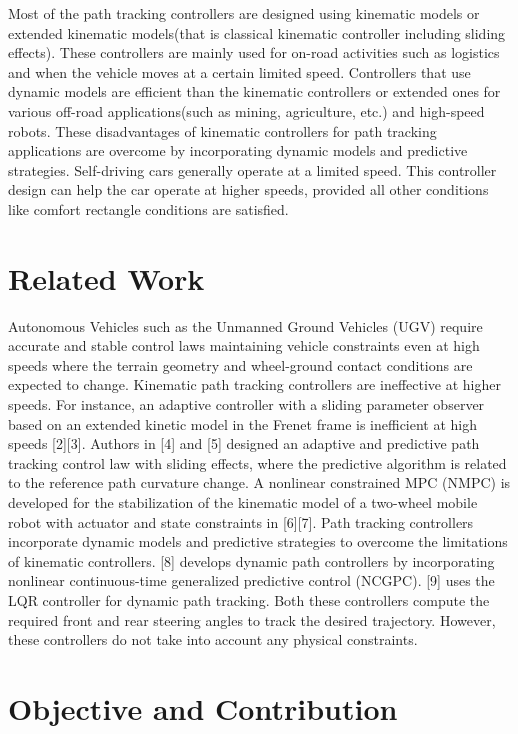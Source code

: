 \documentclass{IEEEtran}
\begin{document}
Most of the path tracking controllers are designed using kinematic models or extended kinematic models(that is classical kinematic controller including sliding effects). These controllers are mainly used for on-road activities such as logistics and when the vehicle moves at a certain limited speed. Controllers that use dynamic models are efficient than the kinematic controllers or extended ones for various off-road applications(such as mining, agriculture, etc.) and high-speed robots. These disadvantages of kinematic controllers for path tracking applications are overcome by incorporating dynamic models and predictive strategies. Self-driving cars generally operate at a limited speed. This controller design can help the car operate at higher speeds, provided all other conditions like comfort rectangle conditions are satisfied. 

\section{Related Work}
Autonomous Vehicles such as the Unmanned Ground Vehicles (UGV) require accurate and stable control laws maintaining vehicle constraints even at high speeds where the terrain geometry and wheel-ground contact conditions are expected to change. Kinematic path tracking controllers are ineffective at higher speeds. For instance, an adaptive controller with a sliding parameter observer based on an extended kinetic model in the Frenet frame is inefficient at high speeds [2][3]. Authors in [4] and [5] designed an adaptive and predictive path tracking control law with sliding effects, where the predictive algorithm is related to the reference path curvature change. A nonlinear constrained MPC (NMPC) is developed for the stabilization of the kinematic model of a two-wheel mobile robot with actuator and state constraints in [6][7]. Path tracking controllers incorporate dynamic models and predictive strategies to overcome the limitations of kinematic controllers. [8] develops dynamic path controllers by incorporating nonlinear continuous-time generalized predictive control (NCGPC). [9] uses the LQR controller for dynamic path tracking. Both these controllers compute the required front and rear steering angles to track the desired trajectory. However, these controllers do not take into account any physical constraints.       

\section{Objective and Contribution}
\end{document}
